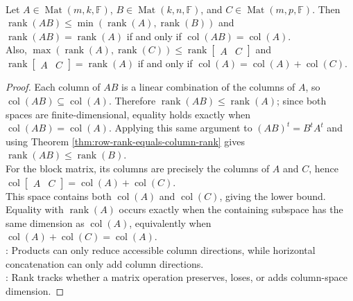 \begin{theorem} \label{thm:rank-product-and-concatenation-bounds} \\
Let $A\in\operatorname{Mat}(m,k,\mathbb{F})$, $B\in\operatorname{Mat}(k,n,\mathbb{F})$, and $C\in\operatorname{Mat}(m,p,\mathbb{F})$. Then $\operatorname{rank}(AB)\leq \min(\operatorname{rank}(A),\operatorname{rank}(B))$ and $\operatorname{rank}(AB)=\operatorname{rank}(A)$ if and only if $\operatorname{col}(AB)=\operatorname{col}(A)$.\\
Also, $\max(\operatorname{rank}(A),\operatorname{rank}(C))\leq\operatorname{rank}\!\begin{bmatrix}A & C\end{bmatrix}$ and $\operatorname{rank}\!\begin{bmatrix}A & C\end{bmatrix}=\operatorname{rank}(A)$ if and only if $\operatorname{col}(A)=\operatorname{col}(A)+\operatorname{col}(C)$.
\begin{proof}
Each column of $AB$ is a linear combination of the columns of $A$, so $\operatorname{col}(AB)\subseteq\operatorname{col}(A)$. Therefore $\operatorname{rank}(AB)\leq\operatorname{rank}(A)$; since both spaces are finite-dimensional, equality holds exactly when $\operatorname{col}(AB)=\operatorname{col}(A)$. Applying this same argument to $(AB)^t=B^tA^t$ and using Theorem \ref{thm:row-rank-equals-column-rank} gives $\operatorname{rank}(AB)\leq\operatorname{rank}(B)$.\\
For the block matrix, its columns are precisely the columns of $A$ and $C$, hence $\operatorname{col}\!\begin{bmatrix}A & C\end{bmatrix} =\operatorname{col}(A)+\operatorname{col}(C)$.\\
This space contains both $\operatorname{col}(A)$ and $\operatorname{col}(C)$, giving the lower bound. Equality with $\operatorname{rank}(A)$ occurs exactly when the containing subspace has the same dimension as $\operatorname{col}(A)$, equivalently when $\operatorname{col}(A)+\operatorname{col}(C)=\operatorname{col}(A)$.\\
: Products can only reduce accessible column directions, while horizontal concatenation can only add column directions.\\
: Rank tracks whether a matrix operation preserves, loses, or adds column-space dimension.
\end{proof}
\end{theorem}


